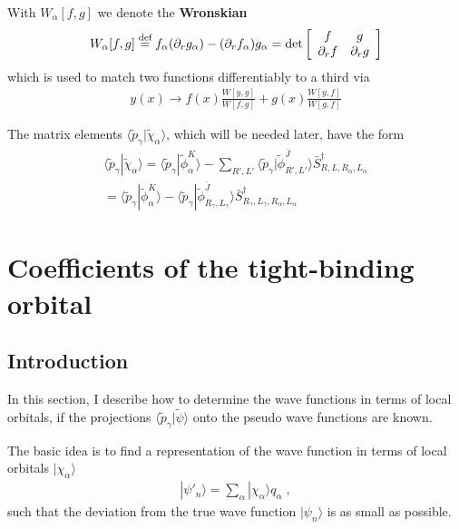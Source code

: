 \documentclass[11pt,a4paper]{report}
\begin{document}
With $W_\alpha[f,g]$ we denote the \textbf{Wronskian}
\begin{eqnarray}
W_\alpha[f,g]\stackrel{\text{def}}{=} f_\alpha (\partial_r g_\alpha)-(\partial_r f_\alpha)g_\alpha
=\det\left[\begin{array}{cc}f&g\\\partial_rf&\partial_rg\end{array}\right]
\end{eqnarray}
which is used to match two functions differentiably to a third via
\begin{eqnarray}
y(x)\rightarrow f(x)\frac{W[y,g]}{W[f,g]}+g(x)\frac{W[y,f]}{W[g,f]}
\end{eqnarray}


The matrix elements
$\langle\tilde{p}_\gamma|\tilde{\chi}_\alpha\rangle$, which will be
needed later, have the form
\begin{eqnarray}
\langle\tilde{p}_\gamma|\tilde{\chi}_\alpha\rangle
=\langle\tilde{p}_\gamma|\tilde{\phi}^K_\alpha\rangle
-\sum_{R',L'}\langle\tilde{p}_\gamma|\tilde{\phi}^{\bar{J}}_{R',L'}\rangle
\bar{S}^\dagger_{R,L,R_\alpha,L_\alpha}
\nonumber\\
=\langle\tilde{p}_\gamma|\tilde{\phi}^K_\alpha\rangle
-\langle\tilde{p}_\gamma|\tilde{\phi}^{\bar{J}}_{R_\gamma,L_\gamma}\rangle
\bar{S}^\dagger_{R_\gamma,L_\gamma,R_\alpha,L_\alpha}
\end{eqnarray}

\section{Coefficients of the tight-binding orbital}
\subsection{Introduction}
In this section, I describe how to determine the wave functions in
terms of local orbitals, if the projections
$\langle\tilde{p}_\gamma|\tilde{\psi}\rangle$ onto the pseudo wave
functions are known.

The basic idea is to find a representation of the wave function in
terms of local orbitals $|\chi_\alpha\rangle$
\begin{eqnarray}
|\psi'_n\rangle=\sum_\alpha |\chi_\alpha\rangle q_\alpha\;,
\end{eqnarray}
such that the deviation from the true wave function $|\psi_n\rangle$
is as small as possible.
\end{document}
